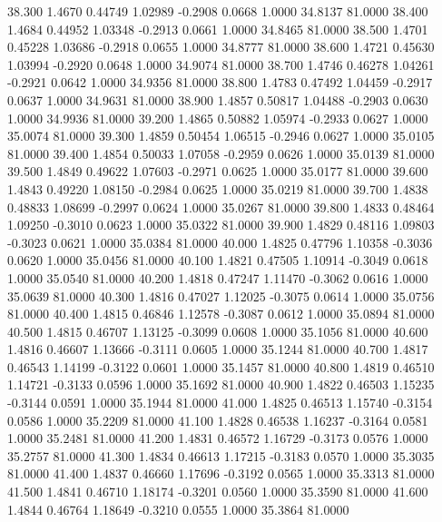   38.300   1.4670   0.44749   1.02989  -0.2908   0.0668   1.0000  34.8137  81.0000
  38.400   1.4684   0.44952   1.03348  -0.2913   0.0661   1.0000  34.8465  81.0000
  38.500   1.4701   0.45228   1.03686  -0.2918   0.0655   1.0000  34.8777  81.0000
  38.600   1.4721   0.45630   1.03994  -0.2920   0.0648   1.0000  34.9074  81.0000
  38.700   1.4746   0.46278   1.04261  -0.2921   0.0642   1.0000  34.9356  81.0000
  38.800   1.4783   0.47492   1.04459  -0.2917   0.0637   1.0000  34.9631  81.0000
  38.900   1.4857   0.50817   1.04488  -0.2903   0.0630   1.0000  34.9936  81.0000
  39.200   1.4865   0.50882   1.05974  -0.2933   0.0627   1.0000  35.0074  81.0000
  39.300   1.4859   0.50454   1.06515  -0.2946   0.0627   1.0000  35.0105  81.0000
  39.400   1.4854   0.50033   1.07058  -0.2959   0.0626   1.0000  35.0139  81.0000
  39.500   1.4849   0.49622   1.07603  -0.2971   0.0625   1.0000  35.0177  81.0000
  39.600   1.4843   0.49220   1.08150  -0.2984   0.0625   1.0000  35.0219  81.0000
  39.700   1.4838   0.48833   1.08699  -0.2997   0.0624   1.0000  35.0267  81.0000
  39.800   1.4833   0.48464   1.09250  -0.3010   0.0623   1.0000  35.0322  81.0000
  39.900   1.4829   0.48116   1.09803  -0.3023   0.0621   1.0000  35.0384  81.0000
  40.000   1.4825   0.47796   1.10358  -0.3036   0.0620   1.0000  35.0456  81.0000
  40.100   1.4821   0.47505   1.10914  -0.3049   0.0618   1.0000  35.0540  81.0000
  40.200   1.4818   0.47247   1.11470  -0.3062   0.0616   1.0000  35.0639  81.0000
  40.300   1.4816   0.47027   1.12025  -0.3075   0.0614   1.0000  35.0756  81.0000
  40.400   1.4815   0.46846   1.12578  -0.3087   0.0612   1.0000  35.0894  81.0000
  40.500   1.4815   0.46707   1.13125  -0.3099   0.0608   1.0000  35.1056  81.0000
  40.600   1.4816   0.46607   1.13666  -0.3111   0.0605   1.0000  35.1244  81.0000
  40.700   1.4817   0.46543   1.14199  -0.3122   0.0601   1.0000  35.1457  81.0000
  40.800   1.4819   0.46510   1.14721  -0.3133   0.0596   1.0000  35.1692  81.0000
  40.900   1.4822   0.46503   1.15235  -0.3144   0.0591   1.0000  35.1944  81.0000
  41.000   1.4825   0.46513   1.15740  -0.3154   0.0586   1.0000  35.2209  81.0000
  41.100   1.4828   0.46538   1.16237  -0.3164   0.0581   1.0000  35.2481  81.0000
  41.200   1.4831   0.46572   1.16729  -0.3173   0.0576   1.0000  35.2757  81.0000
  41.300   1.4834   0.46613   1.17215  -0.3183   0.0570   1.0000  35.3035  81.0000
  41.400   1.4837   0.46660   1.17696  -0.3192   0.0565   1.0000  35.3313  81.0000
  41.500   1.4841   0.46710   1.18174  -0.3201   0.0560   1.0000  35.3590  81.0000
  41.600   1.4844   0.46764   1.18649  -0.3210   0.0555   1.0000  35.3864  81.0000
